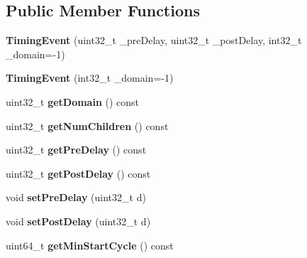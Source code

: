 \subsection*{Public Member Functions}
\begin{DoxyCompactItemize}
\item 
\hypertarget{classTimingEvent_afe75538f63e735efa562a170d818abd2}{{\bfseries Timing\-Event} (uint32\-\_\-t \-\_\-pre\-Delay, uint32\-\_\-t \-\_\-post\-Delay, int32\-\_\-t \-\_\-domain=-\/1)}\label{classTimingEvent_afe75538f63e735efa562a170d818abd2}

\item 
\hypertarget{classTimingEvent_a9cb879fb72ed394efeec28d8aabf2559}{{\bfseries Timing\-Event} (int32\-\_\-t \-\_\-domain=-\/1)}\label{classTimingEvent_a9cb879fb72ed394efeec28d8aabf2559}

\item 
\hypertarget{classTimingEvent_a8541e32c1c59a979f635bde6c809ebb6}{uint32\-\_\-t {\bfseries get\-Domain} () const }\label{classTimingEvent_a8541e32c1c59a979f635bde6c809ebb6}

\item 
\hypertarget{classTimingEvent_a700e1a18857fd2292a28d42e146791d3}{uint32\-\_\-t {\bfseries get\-Num\-Children} () const }\label{classTimingEvent_a700e1a18857fd2292a28d42e146791d3}

\item 
\hypertarget{classTimingEvent_a6835885f10c5af3d2ef2bb1b57459009}{uint32\-\_\-t {\bfseries get\-Pre\-Delay} () const }\label{classTimingEvent_a6835885f10c5af3d2ef2bb1b57459009}

\item 
\hypertarget{classTimingEvent_a59e2e512d24bb6d2e25ca16752e43c3b}{uint32\-\_\-t {\bfseries get\-Post\-Delay} () const }\label{classTimingEvent_a59e2e512d24bb6d2e25ca16752e43c3b}

\item 
\hypertarget{classTimingEvent_ac2945c5c46334e344b6e1917edc058ca}{void {\bfseries set\-Pre\-Delay} (uint32\-\_\-t d)}\label{classTimingEvent_ac2945c5c46334e344b6e1917edc058ca}

\item 
\hypertarget{classTimingEvent_a9034f198649e39bf05e77eca1fe38404}{void {\bfseries set\-Post\-Delay} (uint32\-\_\-t d)}\label{classTimingEvent_a9034f198649e39bf05e77eca1fe38404}

\item 
\hypertarget{classTimingEvent_ad33a88bae422d9435a81b22e15f45ae6}{uint64\-\_\-t {\bfseries get\-Min\-Start\-Cycle} () const }\label{classTimingEvent_ad33a88bae422d9435a81b22e15f45ae6}


\end{DoxyCompactItemize}
